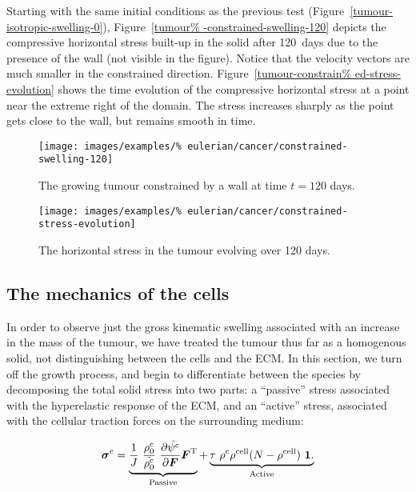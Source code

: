Starting with the same initial conditions as the previous test
(Figure~\ref{tumour-isotropic-swelling-0}), Figure~\ref{tumour%
  -constrained-swelling-120} depicts the compressive horizontal stress
built-up in the solid after 120~days due to the presence of the wall
(not visible in the figure). Notice that the velocity vectors are much
smaller in the constrained direction. Figure~\ref{tumour-constrain%
  ed-stress-evolution} shows the time evolution of the compressive
horizontal stress at a point near the extreme right of the domain. The
stress increases sharply as the point gets close to the wall, but
remains smooth in time.

\begin{figure}[!hptb]
  \centering
  \texttt{[image: images/examples/\%
    eulerian/cancer/constrained-swelling-120]}
  \caption{The growing tumour constrained by a wall at time $t=120$
    days.}
  \label{tumour-constrained-swelling-120}
\end{figure}

\begin{figure}[!hptb]
  \centering
  \texttt{[image: images/examples/\%
    eulerian/cancer/constrained-stress-evolution]}
  \caption{The horizontal stress in the tumour evolving over 120
    days.} 
  \label{tumour-constrained-stress-evolution}
\end{figure}

\clearpage

\subsection{The mechanics of the cells}
\label{cell-roles}

In order to observe just the gross kinematic swelling associated with
an increase in the mass of the tumour, we have treated the tumour thus
far as a homogenous solid, not distinguishing between the cells and
the ECM. In this section, we turn off the growth process, and begin to
differentiate between the species by decomposing the total solid
stress into two parts: a ``passive'' stress associated with the
hyperelastic response of the ECM, and an ``active'' stress, associated
with the cellular traction forces on the surrounding medium:

\begin{equation}
\mbox{\boldmath$\sigma$}^{\mathrm{c}} =
\underbrace{\frac{1}{J}\ \frac{\rho_{0}^{\mathrm{c}}}
  {\tilde{\rho_{0}^{\mathrm{c}}}}\ \frac{\partial
    \hat{\psi^{\mathrm{c}}}}{\partial \mbox{\boldmath$ F$}} \mbox{\boldmath$ F$}^{\mathrm{T}}
}_{\text{Passive}} + \underbrace{\tau\ \rho^{\mathrm{c}}
  \rho^{\mathrm{cell}} (N - \rho^{\mathrm{cell}})\ {\bf 1}.
}_{\text{Active}}
\label{activepassivesplit}
\end{equation}

